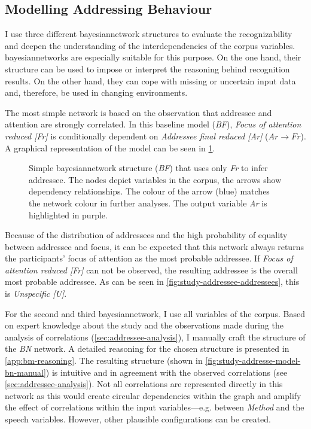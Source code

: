 \subsection{Modelling Addressing Behaviour}

I use three different \gls{bayesiannetwork} structures to evaluate the recognizability and deepen the understanding of the interdependencies of the corpus variables.
\Glspl{bayesiannetwork} are especially suitable for this purpose.
On the one hand, their structure can be used to impose or interpret the reasoning behind recognition results.
On the other hand, they can cope with missing or uncertain input data and, therefore, be used in changing environments.

The most simple network is based on the observation that \gls{addressee} and attention are strongly correlated.
In this baseline model (\emph{BF}), \emph{Focus of attention reduced [Fr]} is conditionally dependent on \emph{Addressee final reduced [Ar]} (\(Ar \rightarrow Fr\)).
A graphical representation of the model can be seen in \cref{fig:study-addressee-model-bn-baseline}.
\begin{figure}[tbh]
    \centering
    \def\svgwidth{0.2\textwidth}
    {\footnotesize
    
    }
    \caption[Baseline model for addressee recognition.]{\label{fig:study-addressee-model-bn-baseline} 
    Simple \gls{bayesiannetwork} structure (\emph{BF}) that uses only \emph{Fr} to infer \gls{addressee}.
    The nodes depict variables in the corpus, the arrows show dependency relationships.
    The colour of the arrow (blue) matches the network colour in further analyses.
    The output variable \emph{Ar} is highlighted in purple.
    }
\end{figure}
Because of the distribution of \glspl{addressee} and the high probability of equality between \gls{addressee} and focus, it can be expected that this network always returns the participants' focus of attention as the most probable \gls{addressee}.
If \emph{Focus of attention reduced [Fr]} can not be observed, the resulting \gls{addressee} is the overall most probable \gls{addressee}.
As can be seen in \cref{fig:study-addressee-addressees}, this is \emph{Unspecific [U]}.

For the second and third \gls{bayesiannetwork}, I use all variables of the corpus.
Based on expert knowledge about the study and the observations made during the analysis of correlations (\cref{sec:addressee-analysis}), I manually craft the structure of the \emph{BN} network.
A detailed reasoning for the chosen structure is presented in \cref{app:bm-reasoning}.
The resulting structure (shown in \cref{fig:study-addresse-model-bn-manual}) is intuitive and in agreement with the observed correlations (see \cref{sec:addressee-analysis}).
Not all correlations are represented directly in this network as this would create circular dependencies within the graph and amplify the effect of correlations within the input variables---e.g. between \emph{Method} and the speech variables.
However, other plausible configurations can be created.

